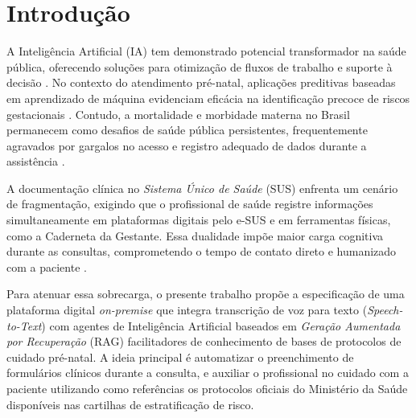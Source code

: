 \documentclass[12pt]{article}
\begin{document}
\section{Introdução}

A Inteligência Artificial (IA) tem demonstrado potencial transformador na saúde pública, oferecendo soluções para otimização de fluxos de trabalho e suporte à decisão \cite{Rajpurkar2022, Cabitza2022}.
No contexto do atendimento pré-natal, aplicações preditivas baseadas em aprendizado de máquina evidenciam eficácia na identificação precoce de riscos gestacionais \cite{HighRiskPregnancy2025, MachineLearning2022}.
Contudo, a mortalidade e morbidade materna no Brasil permanecem como desafios de saúde pública persistentes, frequentemente agravados por gargalos no acesso e registro adequado de dados durante a assistência \cite{AcessoPreNatal2018, Laurenti2010}.

A documentação clínica no \textit{Sistema Único de Saúde} (SUS) enfrenta um cenário de fragmentação, exigindo que o profissional de saúde registre informações simultaneamente em plataformas digitais pelo e-SUS e em ferramentas físicas, como a Caderneta da Gestante.
Essa dualidade impõe maior carga cognitiva durante as consultas, comprometendo o tempo de contato direto e humanizado com a paciente \cite{ThemeFilha2014, Rajpurkar2022}.

Para atenuar essa sobrecarga, o presente trabalho propõe a especificação de uma plataforma digital \textit{on-premise} que integra transcrição de voz para texto (\textit{Speech-to-Text}) com agentes de Inteligência Artificial baseados em \textit{Geração Aumentada por Recuperação} (RAG) facilitadores de conhecimento de bases de protocolos de cuidado pré-natal.
A ideia principal é automatizar o preenchimento de formulários clínicos durante a consulta, e auxiliar o profissional no cuidado com a paciente utilizando como referências os protocolos oficiais do Ministério da Saúde disponíveis nas cartilhas de estratificação de risco.

\end{document}
